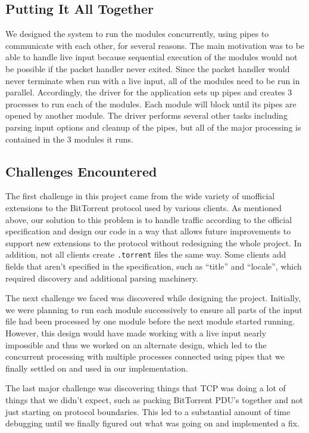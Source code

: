 \documentclass{acm_proc_article-sp}
\begin{document}
\subsection{Putting It All Together}
We designed the system to run the modules concurrently, using pipes to
communicate with each other, for several reasons. The main motivation was to be
able to handle live input because sequential execution of the modules would not
be possible if the packet handler never exited. Since the packet handler would
never terminate when run with a live input, all of the modules need to be run in
parallel. Accordingly, the driver for the application sets up pipes and creates
3 processes to run each of the modules. Each module will block until its pipes
are opened by another module. The driver performs several other tasks including
parsing input options and cleanup of the pipes, but all of the major processing
is contained in the 3 modules it runs.

\subsection{Challenges Encountered}
The first challenge in this project came from the wide variety of unofficial
extensions to the BitTorrent protocol used by various clients. As mentioned
above, our solution to this problem is to handle traffic according to the
official specification and design our code in a way that allows future
improvements to support new extensions to the protocol without redesigning the
whole project.  In addition, not all clients create \texttt{.torrent} files the
same way.  Some clients add fields that aren't specified in the specification,
such as ``title'' and ``locale'', which required discovery and additional
parsing machinery.

The next challenge we faced was discovered while designing the project.
Initially, we were planning to run each module successively to ensure all parts
of the input file had been processed by one module before the next module
started running. However, this design would have made working with a live input
nearly impossible and thus we worked on an alternate design, which led to the
concurrent processing with multiple processes connected using pipes that we
finally settled on and used in our implementation.

The last major challenge was discovering things that TCP was doing a lot of
things that we didn't expect, such as packing BitTorrent PDU's together and not
just starting on protocol boundaries.  This led to a substantial amount of time
debugging until we finally figured out what was going on and implemented a fix.
\end{document}

